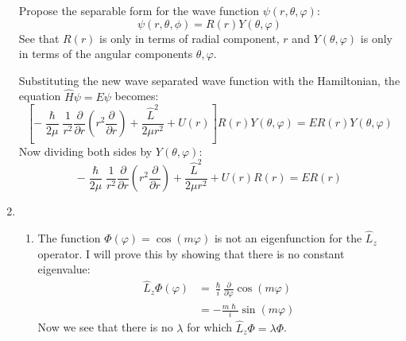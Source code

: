 \documentclass[10pt]{article}
\begin{document}
\begin{enumerate}
    Propose the separable form for the wave function $ \psi \left( r, \theta, \varphi \right) $:
    \begin{equation*}
       \psi \left( r, \theta, \phi \right) = R \left( r \right) Y \left( \theta, \varphi \right)
    \end{equation*}
    See that $ R \left( r \right) $ is only in terms of radial component, $ r $ and $ Y \left( \theta, \varphi \right) $ is only in terms of the angular components $ \theta, \varphi $.

    Substituting the new wave separated wave function with the Hamiltonian, the equation $ \hat{H} \psi = E \psi$ becomes: 
    \begin{equation*}
      \left[ - \frac{\hslash}{2\mu} \frac{1}{r^2} \frac{\partial }{\partial r} \left( r^2 \frac{\partial }{\partial r} \right) + \frac{\hat{L}^2}{2\mu r^2} + U \left( r \right) \right] R \left( r \right) Y \left( \theta, \varphi \right) = E R \left( r \right) Y \left( \theta, \varphi \right) 
    \end{equation*}
    Now dividing both sides by $ Y \left( \theta, \varphi \right) $:
    \begin{equation*}
       - \frac{\hslash}{2\mu} \frac{1}{r^2} \frac{\partial }{\partial r} \left( r^2 \frac{\partial }{\partial r} \right) + \frac{\hat{L}^2}{2\mu r^2} + U \left( r \right)  R \left( r \right) = E R \left( r \right) 
    \end{equation*}
  \item 
    \begin{enumerate}
    \item 
      The function $ \Phi \left( \varphi \right) = \cos \left( m \varphi \right) $ is not an eigenfunction for the $ \hat{L}_{z} $ operator.
      I will prove this by showing that there is no constant eigenvalue:
      \begin{align*}
      \hat{L}_{z} \Phi \left( \varphi \right) &= \frac{\hslash}{i}\frac{\partial }{\partial \varphi} \cos \left( m \varphi \right) \\
      &= - \frac{m\hslash}{i} \sin \left( m \varphi \right)
      \end{align*}
      Now we see that there is no $ \lambda $ for which $ \hat{L}_{z} \Phi = \lambda \Phi $.


\end{enumerate}
\end{enumerate}
\end{document}
